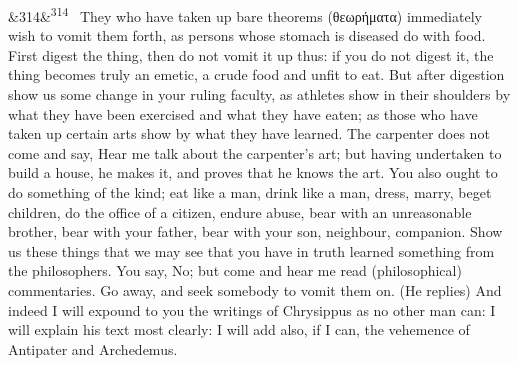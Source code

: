 \documentclass[12pt]{article}
\newcommand{\para}[1][]{\par\noindent\ifx&#1&\else\textsuperscript{\footnotesize #1}~\fi}
\begin{document}
\para[314] They who have taken up bare theorems (θεωρήματα) immediately wish to vomit them forth, as persons whose stomach is diseased do with food. First digest the thing, then do not vomit it up thus: if you do not digest it, the thing becomes truly an emetic, a crude food and unfit to eat. But after digestion show us some change in your ruling faculty, as athletes show in their shoulders by what they have been exercised and what they have eaten; as those who have taken up certain arts show by what they have learned. The carpenter does not come and say, Hear me talk about the carpenter's art; but having undertaken to build a house, he makes it, and proves that he knows the art. You also ought to do something of the kind; eat like a man, drink like a man, dress, marry, beget children, do the office of a citizen, endure abuse, bear with an unreasonable brother, bear with your father, bear with your son, neighbour, companion. Show us these things that we may see that you have in truth learned something from the philosophers. You say, No; but come and hear me read (philosophical) commentaries. Go away, and seek somebody to vomit them on. (He replies) And indeed I will expound to you the writings of Chrysippus as no other man can: I will explain his text most clearly: I will add also, if I can, the vehemence of Antipater and Archedemus.
\end{document}
